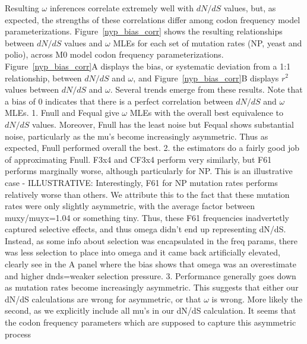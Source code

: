 \documentclass[11pt]{article}
\begin{document}
Resulting $\omega$ inferences correlate extremely well with $dN/dS$ values, but, as expected, the strengths of these correlations differ among codon frequency model parameterizations. Figure~\ref{nyp_bias_corr} shows the resulting relationships between $dN/dS$ values and $\omega$ MLEs for each set of mutation rates (NP, yeast and polio), across M0 model codon frequency parameterizations. Figure~\ref{nyp_bias_corr}A displays the bias, or systematic deviation from a 1:1 relationship, between $dN/dS$ and $\omega$, and Figure~\ref{nyp_bias_corr}B displays $r^2$ values between $dN/dS$ and $\omega$. Several trends emerge from these results. Note that a bias of 0 indicates that there is a perfect correlation between $dN/dS$ and $\omega$ MLEs.
1. Fnull and Fequal give $\omega$ MLEs with the overall best equivalence to $dN/dS$ values. Moreover, Fnull has the least noise but Fequal shows substantial noise, particularly as the mu's become increasingly asymmetric. Thus as expected, Fnull performed overall the best. 
2. the estimators do a fairly good job of approximating Fnull. F3x4 and CF3x4 perform very similarly, but F61 performs marginally worse, although particularly for NP. This is an illustrative case - ILLUSTRATIVE: Interestingly, F61 for NP mutation rates performs relatively worse than others. We attribute this to the fact that these mutation rates were only slightly asymmetric, with the average factor between muxy/muyx=1.04 or something tiny. Thus, these F61 frequencies inadvertetly captured selective effects, and thus omega didn't end up representing dN/dS. Instead, as some info about selection was encapsulated in the freq params, there was less selection to place into omega and it came back artificially elevated, clearly see in the A panel where the bias shows that omega was an overestimate and higher dnds=weaker selection pressure.
3. Performance generally goes down as mutation rates become increasingly asymmetric. This suggests that either our dN/dS calculations are wrong for asymmetric, or that $\omega$ is wrong. More likely the second, as we explicitly include all mu's in our dN/dS calculation. It seems that the codon frequency parameters which are supposed to capture this asymmetric process
\end{document}
